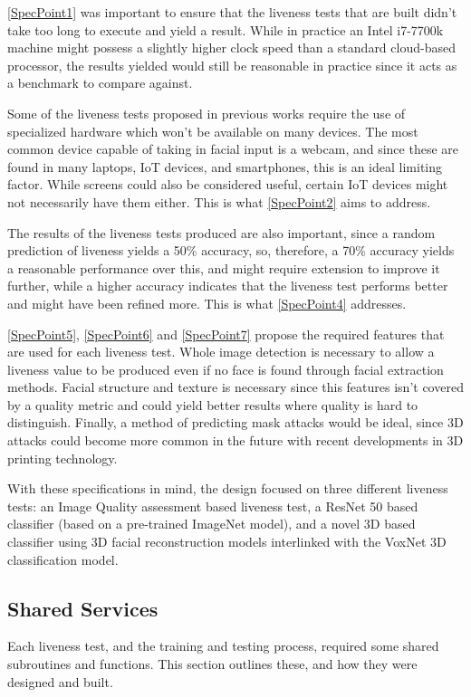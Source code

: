 \documentclass[10pt,a4paper]{article}
\begin{document}
        \ref{SpecPoint1} was important to ensure that the liveness tests that are built didn't take too long to execute and yield a result. While in practice an Intel i7-7700k machine might possess a
        slightly higher clock speed than a standard cloud-based processor, the results yielded would still be reasonable in practice since it acts as a benchmark to compare against.

        Some of the liveness tests proposed in previous works require the use of specialized hardware which won't be available on many devices. The most common device capable of taking in facial input is a
        webcam, and since these are found in many laptops, IoT devices, and smartphones, this is an ideal limiting factor. While screens could also be considered useful, certain IoT devices might not necessarily have them either.
        This is what \ref{SpecPoint2} aims to address.

        The results of the liveness tests produced are also important, since a random prediction of liveness yields a 50\% accuracy, so, therefore, a 70\% accuracy yields a reasonable performance over this, and might require extension to improve it further,
        while a higher accuracy indicates that the liveness test performs better and might have been refined more. This is what \ref{SpecPoint4} addresses.

        \ref{SpecPoint5}, \ref{SpecPoint6} and \ref{SpecPoint7} propose the required features that are used for each liveness test. Whole image detection is necessary to allow a liveness value to be produced even if no face is found through facial extraction methods. Facial structure and texture is necessary since this features isn't covered by a quality metric and could yield better results where quality is hard to distinguish. Finally, a method of predicting mask attacks would be ideal, since 3D attacks could become more common in the future with recent developments in 3D printing technology.

        With these specifications in mind, the design focused on three different liveness tests: an Image Quality assessment based liveness test, a ResNet 50 based classifier (based on a pre-trained ImageNet model),
        and a novel 3D based classifier using 3D facial reconstruction models interlinked with the VoxNet 3D classification model.


    \subsection{Shared Services}
        Each liveness test, and the training and testing process, required some shared subroutines and functions. This section outlines these, and how they were designed and built.
\end{document}
